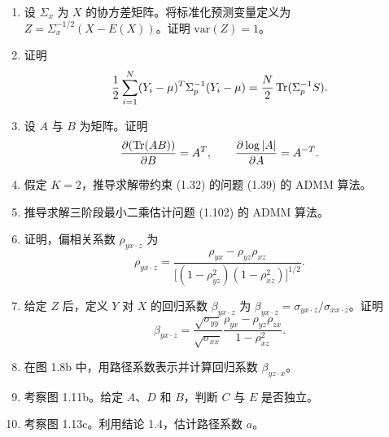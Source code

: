 \begin{enumerate}[label=\textbf{习题 \arabic*.},leftmargin=4.8em,align=left,itemsep=0.7em]
\item 设 $\Sigma_x$ 为 $X$ 的协方差矩阵。将标准化预测变量定义为 $Z=\Sigma_x^{-1/2}(X-E(X))$。证明 $\mathrm{var}(Z)=1$。

\item 证明
\[
\frac12\sum_{i=1}^N(Y_i-\mu)^T\Sigma_p^{-1}(Y_i-\mu)
=\frac N2\operatorname{Tr}(\Sigma_p^{-1}S).
\]

\item 设 $A$ 与 $B$ 为矩阵。证明
\[
\frac{\partial(\operatorname{Tr}(AB))}{\partial B}=A^T,
\qquad
\frac{\partial\log|A|}{\partial A}=A^{-T}.
\]

\item 假定 $K=2$，推导求解带约束 (1.32) 的问题 (1.39) 的 ADMM 算法。

\item 推导求解三阶段最小二乘估计问题 (1.102) 的 ADMM 算法。

\item 证明，偏相关系数 $\rho_{yx\cdot z}$ 为
\[
\rho_{yx\cdot z}
=\frac{\rho_{yx}-\rho_{yz}\rho_{xz}}
{\bigl[(1-\rho_{yz}^2)(1-\rho_{xz}^2)\bigr]^{1/2}}.
\]

\item 给定 $Z$ 后，定义 $Y$ 对 $X$ 的回归系数 $\beta_{yx\cdot z}$ 为
$\beta_{yx\cdot z}=\sigma_{yx\cdot z}/\sigma_{xx\cdot z}$。证明
\[
\beta_{yx\cdot z}
=\frac{\sqrt{\sigma_{yy}}}{\sqrt{\sigma_{xx}}}
\frac{\rho_{yx}-\rho_{yz}\rho_{zx}}{1-\rho_{xz}^2}.
\]

\item 在图 1.8b 中，用路径系数表示并计算回归系数 $\beta_{yz\cdot x}$。

\item 考察图 1.11b。给定 $A$、$D$ 和 $B$，判断 $C$ 与 $E$ 是否独立。

\item 考察图 1.13c。利用结论 1.4，估计路径系数 $a$。
\end{enumerate}
